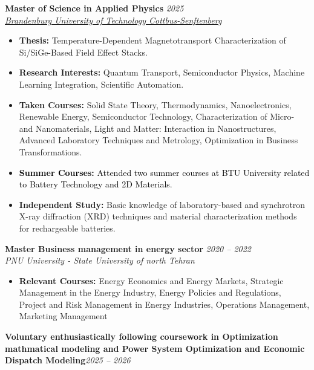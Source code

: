 \documentclass[10pt, a4paper]{article}
\begin{document}
\textbf{Master of Science in Applied Physics} \hfill \textit{2025} \\
\textit{\href{https://www.b-tu.de/en/}{Brandenburg University of Technology Cottbus-Senftenberg}}
\begin{itemize}[label={}]
  \item \textbf{Thesis:} Temperature-Dependent Magnetotransport Characterization of Si/SiGe-Based Field Effect Stacks.
  \item \textbf{Research Interests:} Quantum Transport, Semiconductor Physics, Machine Learning Integration, Scientific Automation.
  \item \textbf{Taken Courses:} Solid State Theory, Thermodynamics, Nanoelectronics, Renewable Energy, Semiconductor Technology, Characterization of Micro- and Nanomaterials, Light and Matter: Interaction in Nanostructures, Advanced Laboratory Techniques and Metrology, Optimization in Business Transformations.
  \item \textcolor{black}{\textbf{Summer Courses:} Attended two summer courses at BTU University related to Battery Technology and 2D Materials.}
  \item \textbf{Independent Study:} Basic knowledge of laboratory-based and synchrotron X-ray diffraction (XRD) techniques and material characterization methods for rechargeable batteries.
\end{itemize}
\vspace{0.4em}
\textbf{Master Business management in energy sector} \hfill \textit{2020 -- 2022} \\
\textit{PNU University - State University of north Tehran}
\begin{itemize}[label={}]
  \item \textbf{Relevant Courses:}  Energy Economics and Energy Markets, Strategic Management in the Energy Industry, Energy Policies and Regulations, Project and Risk Management in Energy Industries, Operations Management, Marketing Management
  \end{itemize}
\textbf{Voluntary enthusiastically following coursework in Optimization mathmatical modeling and Power System Optimization and Economic Dispatch Modeling}\hfill \textit{2025 -- 2026}
\end{document}
